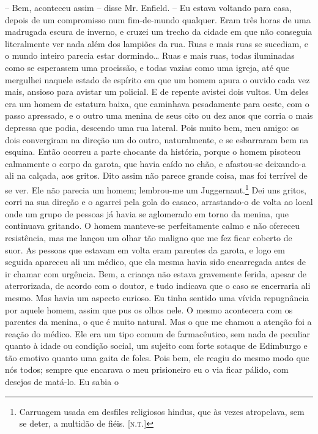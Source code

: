 -- Bem, aconteceu assim -- disse Mr. Enfield. -- Eu estava voltando para
casa, depois de um compromisso num fim-de-mundo qualquer.  Eram três
horas de uma madrugada escura de inverno, e cruzei um trecho da cidade
em que não conseguia literalmente ver nada além dos lampiões da rua. 
Ruas e mais ruas se sucediam, e o mundo inteiro parecia estar
dormindo\ldots{} Ruas e mais ruas, todas iluminadas como se esperassem uma
procissão, e todas vazias como uma igreja, até que mergulhei naquele
estado de espírito em que um homem apura o ouvido cada vez mais,
ansioso para avistar um policial.  E de repente avistei dois vultos. 
Um deles era um homem de estatura baixa, que caminhava pesadamente para
oeste, com o passo apressado, e o outro uma menina de seus oito ou dez
anos que corria o mais depressa que podia, descendo uma rua lateral. 
Pois muito bem, meu amigo: os dois convergiram na direção um do outro,
naturalmente, e se esbarraram bem na esquina.  Então ocorreu a parte
chocante da história, porque o homem pisoteou calmamente o corpo da
garota, que havia caído no chão, e afastou-se deixando-a ali na
calçada, aos gritos.  Dito assim não parece grande coisa, mas foi
terrível de se ver.  Ele não parecia um homem; lembrou-me um Juggernaut.\footnote{
Carruagem usada em desfiles religiosos hindus, que às vezes atropelava,
sem se deter, a multidão de fiéis. [\textsc{n.t.}]} Dei uns gritos, corri na sua direção e o agarrei
pela gola do casaco, arrastando-o de volta ao local onde um grupo de
pessoas já havia se aglomerado em torno da menina, que continuava
gritando.  O homem manteve-se perfeitamente calmo e não ofereceu
resistência, mas me lançou um olhar tão maligno que me fez ficar
coberto de suor.  As pessoas que estavam em volta eram parentes da garota, e
logo em seguida apareceu ali um médico, que ela mesma havia sido
encarregada antes de ir chamar com urgência.  Bem, a criança não estava
gravemente ferida, apesar de aterrorizada, de acordo com o doutor, e
tudo indicava que o caso se encerraria ali mesmo.  Mas havia um aspecto
curioso.  Eu tinha sentido uma vívida repugnância por aquele homem,
assim que pus os olhos nele.  O mesmo acontecera com os parentes da
menina, o que é muito natural.  Mas o que me chamou a atenção foi a
reação do médico.  Ele era um tipo comum de farmacêutico, sem nada de
peculiar quanto à idade ou condição social, um sujeito com forte
sotaque de Edimburgo e tão emotivo quanto uma gaita de foles.  Pois
bem, ele reagiu do mesmo modo que nós todos; sempre que encarava o meu
prisioneiro eu o via ficar pálido, com desejos de matá-lo.  Eu sabia o
